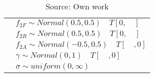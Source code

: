 \begin{table}[!ht]
\begin{tabular} {ll}
                          &$f_{2F} \sim Normal (0.5,0.5) \quad T[0,\quad]$\\
                          &$f_{2R} \sim Normal (0.5,0.5) \quad T[0,\quad]$\\
                          &$f_{2A} \sim Normal (-0.5,0.5) \quad T[\quad,0]$\\
                          &$\gamma \sim Normal (0,1)  \quad T[\quad,0]$\\
                          &$\sigma \sim uniform(0,\infty) $\\ 
\bottomrule
\end{tabular}%
\caption*{Source: Own work}
\end{table} 
